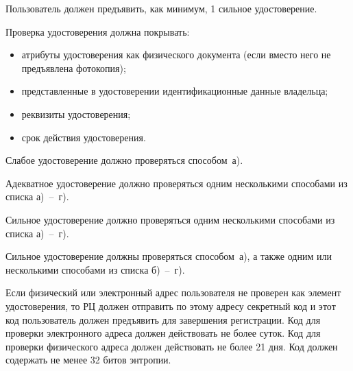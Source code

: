 Пользователь должен предъявить, как минимум, 1 сильное удостоверение.



Проверка удостоверения должна покрывать:
\begin{itemize}
\item
атрибуты удостоверения как физического документа 
(если вместо него не предъявлена фотокопия);
\item
представленные в удостоверении идентификационные данные владельца;
\item
реквизиты удостоверения;
\item
срок действия удостоверения.
\end{itemize}


Слабое удостоверение должно проверяться способом~а).


Адекватное удостоверение должно проверяться одним  несколькими 
способами из списка а)~--~г).


Сильное удостоверение должно проверяться одним  несколькими 
способами из списка а)~--~г).

Сильное удостоверение должны проверяться способом~а), 
а также одним или несколькими способами из списка б)~--~г).



Если физический или электронный адрес пользователя не проверен
как элемент удостоверения, то РЦ должен отправить по этому 
адресу секретный код и этот код пользователь должен предъявить 
для завершения регистрации. 
%
Код для проверки электронного адреса должен действовать не более суток.
%
Код для проверки физического адреса должен действовать не более 21 дня.
%
Код должен содержать не менее 32 битов энтропии.

